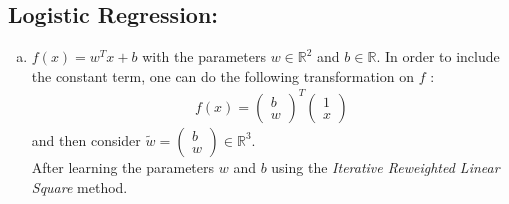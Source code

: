 \documentclass[a4paper,10pt]{article}
\theoremstyle{exostyle}
\begin{document}
\subsection{Logistic Regression:} 
\begin{enumerate}[(a)]
\item $f(x) = w^T x + b$ with the parameters $ w \in \mathbb{R}^2$ and $b \in \mathbb{R}$. In order to include the constant term, one can do the following transformation on $f$ : 
\begin{align*}
f(x) = \begin{pmatrix} b \\ w \end{pmatrix}^T   \begin{pmatrix} 1 \\ x \end{pmatrix}
\end{align*}
and then consider $\tilde{w} = \begin{pmatrix} b \\ w \end{pmatrix} \in  \mathbb{R}^3$. \\
After learning the parameters $w$ and $b$ using the \textit{Iterative Reweighted Linear Square} method. 


\end{enumerate}
\end{document}
